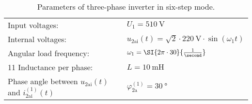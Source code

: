 \begin{table}[ht]
    \centering  %
    \begin{tabular}{ll}
        \toprule
        Input voltages: & $U_\mathrm{1}=\SI{510}{\volt}$ \\
        Internal voltages: & $u_{\mathrm{2ai}}(t) = \sqrt{2} \cdot \SI{220}{\volt} \cdot \sin(\omega_1t)$ \\
        Angular load frequency: & $\omega_1 = \SI{2 \pi \cdot 30}{\frac{1}{\second}}$ \\ 11
        Inductance per phase: & $L= \SI{10}{\milli \henry}$ \\
        Phase angle between  $u_{\mathrm{2ai}}(t)$ and $i_{\mathrm{2ai}}^\mathrm{(1)}(t)$ & $\varphi_{\mathrm{2a}}^\mathrm{(1)}=\SI{30}{\degree}$ \\
        \bottomrule
    \end{tabular}
    \caption{Parameters of three-phase inverter in six-step mode.}  
    \label{table:ex07_Task2_ParametersOfTheCircuit}
\end{table}

